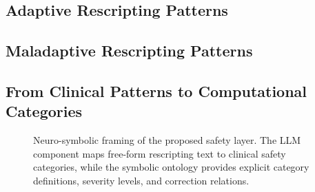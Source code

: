 \subsection{Adaptive Rescripting Patterns}


\subsection{Maladaptive Rescripting Patterns}


\subsection{From Clinical Patterns to Computational Categories}


\begin{table}
  \centering
  \caption{Adaptive and maladaptive rescripting patterns with definitions, examples, and clinical rationale/source basis.}
  \label{tab:clinical-safety-categories}
\end{table}

\begin{figure}
  \centering
  \caption{Neuro-symbolic framing of the proposed safety layer. The LLM component maps free-form rescripting text to clinical safety categories, while the symbolic ontology provides explicit category definitions, severity levels, and correction relations.}
  \label{fig:neuro-symbolic-framing}
\end{figure}
